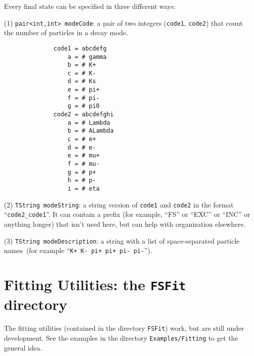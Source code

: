 \documentclass[11pt]{article}
\begin{document}
Every final state can be specified in three different ways:

(1) {\tt pair<int,int> modeCode}: a pair of two integers ({\tt code1}, {\tt code2}) that count the number of particles in a decay mode.
\begin{verbatim}
              code1 = abcdefg
                  a = # gamma
                  b = # K+
                  c = # K-
                  d = # Ks
                  e = # pi+
                  f = # pi-
                  g = # pi0
              code2 = abcdefghi
                  a = # Lambda
                  b = # ALambda
                  c = # e+
                  d = # e-
                  e = # mu+
                  f = # mu-
                  g = # p+
                  h = # p-
                  i = # eta
\end{verbatim}
(2) {\tt TString modeString}: a string version of {\tt code1} and {\tt code2} in the format ``{\tt code2\_code1}''.  It can contain a prefix (for example, ``FS'' or ``EXC'' or ``INC'' or anything longer) that isn't used here, but can help with organization elsewhere.

(3) {\tt TString modeDescription}: a string with a list of space-separated particle names~(for example ``{\tt K+ K- pi+ pi+ pi- pi-}'').



\section{Fitting Utilities:  the {\tt FSFit} directory}

The fitting utilities (contained in the directory {\tt FSFit}) work, but are still under development.  See the examples in the directory {\tt Examples/Fitting} to get the general idea.
\end{document}
